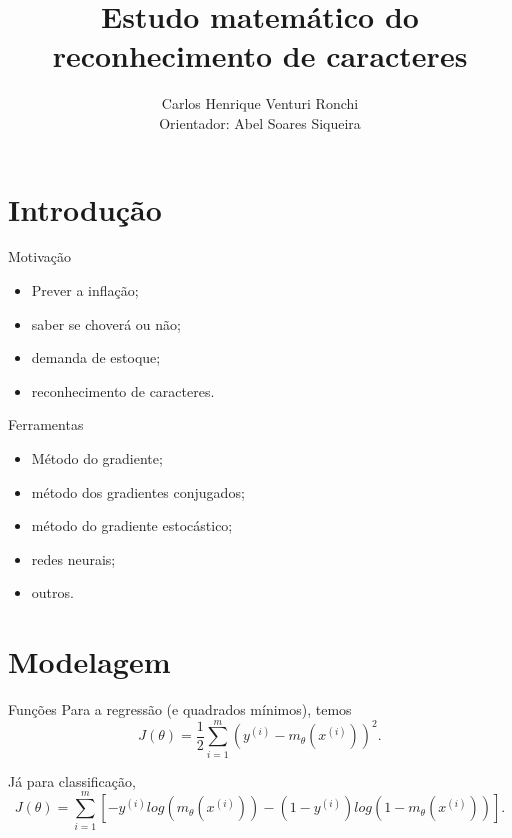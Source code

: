 \documentclass{beamer}
\title{Estudo matemático do reconhecimento
de caracteres}
\author[Carlos Ronchi]{Carlos Henrique Venturi Ronchi\\{\small Orientador: Abel Soares Siqueira}}
\institute{Universidade Federal do Paraná - UFPR}
\begin{document}
\begin{frame}
    \titlepage    
\end{frame}

\begin{frame}
    \tableofcontents
\end{frame}

\section{Introdução}
    \begin{frame}{Motivação}
        \begin{itemize}
            \item Prever a inflação;
            \item saber se choverá ou não;
            \item demanda de estoque;
            \item reconhecimento de caracteres.
        \end{itemize}
    \end{frame}
    
    \begin{frame}{Ferramentas}
        \begin{itemize}
            \item Método do gradiente;
            \item método dos gradientes conjugados;
            \item método do gradiente estocástico;
            \item redes neurais;
            \item outros.
        \end{itemize}
    \end{frame}
    
\section{Modelagem}    
    
    \begin{frame}{Funções}
        Para a regressão (e quadrados mínimos), temos
        \begin{equation*}
            J(\theta) = \frac{1}{2} \sum_{i=1}^{m}(y^{(i)}- m_\theta(x^{(i)}))^2.
        \end{equation*}
        
        Já para classificação, 
        \begin{equation*}
            J(\theta) = \sum_{i=1}^{m}\left[-y^{(i)}log(m_\theta(x^{(i)})) - (1-y^{(i)})log(1-m_\theta(x^{(i)}))\right].
        \end{equation*}
    \end{frame}
    
\end{document}
